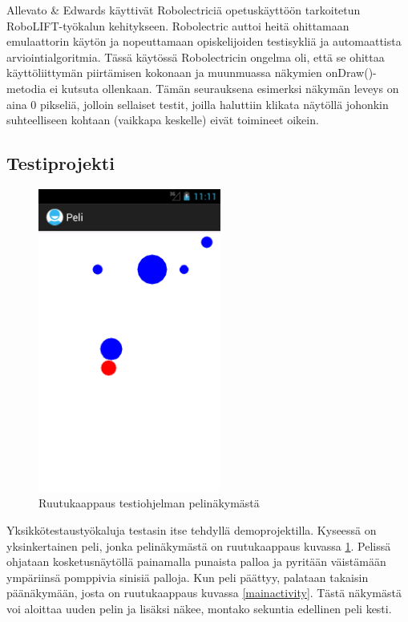 Allevato \& Edwards \cite{robolift} käyttivät Robolectriciä opetuskäyttöön tarkoitetun RoboLIFT-työkalun kehitykseen. Robolectric auttoi heitä ohittamaan emulaattorin käytön ja nopeuttamaan opiskelijoiden testisykliä ja automaattista arviointialgoritmia. Tässä käytössä Robolectricin ongelma oli, että se ohittaa käyttöliittymän piirtämisen kokonaan ja muunmuassa näkymien onDraw()-metodia ei kutsuta ollenkaan. Tämän seurauksena esimerksi näkymän leveys on aina 0 pikseliä, jolloin sellaiset testit, joilla haluttiin klikata näytöllä johonkin suhteelliseen kohtaan (vaikkapa keskelle) eivät toimineet oikein.

\subsection{Testiprojekti}

\begin{figure}[h]
\centering
\includegraphics[width=60mm]{peli_screenshot.png}
\caption{Ruutukaappaus testiohjelman pelinäkymästä} \label{peli_screenshot}
\end{figure}

Yksikkötestaustyökaluja testasin itse tehdyllä demoprojektilla. Kyseessä on yksinkertainen peli, jonka pelinäkymästä on ruutukaappaus kuvassa \ref{peli_screenshot}. Pelissä ohjataan kosketusnäytöllä painamalla punaista palloa ja pyritään väistämään ympäriinsä pomppivia sinisiä palloja. Kun peli päättyy, palataan takaisin päänäkymään, josta on ruutukaappaus kuvassa \ref{mainactivity}. Tästä näkymästä voi aloittaa uuden pelin ja lisäksi näkee, montako sekuntia edellinen peli kesti.

